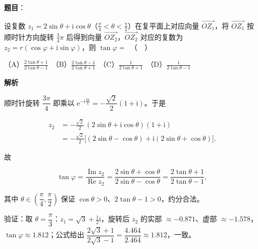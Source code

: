 \begin{answer}

\textbf{题目}：

设复数 $z_1 = 2\sin\theta + \mathrm{i}\cos\theta$（$\frac{\pi}{4} < \theta < \frac{\pi}{2}$）在复平面上对应向量 $\overrightarrow{OZ_1}$，将 $\overrightarrow{OZ_1}$ 按顺时针方向旋转 $\frac{3}{4}\pi$ 后得到向量 $\overrightarrow{OZ_2}$，$\overrightarrow{OZ_2}$ 对应的复数为 $z_2 = r(\cos\varphi + \mathrm{i}\sin\varphi)$，则 $\tan\varphi =$　（　）

（A）$\frac{2\tan\theta + 1}{2\tan\theta - 1}$　（B）$\frac{2\tan\theta - 1}{2\tan\theta + 1}$　（C）$\frac{1}{2\tan\theta + 1}$　（D）$\frac{1}{2\tan\theta - 1}$

\textbf{解析}

顺时针旋转 $\dfrac{3\pi}{4}$ 即乘以 $\mathrm e^{-\mathrm i\frac{3\pi}{4}}=-\dfrac{\sqrt2}{2}(1+\mathrm i)$。于是

\nopagebreak[4]
\[\begin{aligned}
z_2&=-\frac{\sqrt2}{2}\,(2\sin\theta+\mathrm i\cos\theta)(1+\mathrm i)\\
&=-\frac{\sqrt2}{2}\Big[(2\sin\theta-\cos\theta)+\mathrm i(2\sin\theta+\cos\theta)\Big].
\end{aligned}\]

故

\nopagebreak[4]
\[\tan\varphi=\frac{\operatorname{Im}z_2}{\operatorname{Re}z_2}=\frac{2\sin\theta+\cos\theta}{2\sin\theta-\cos\theta}=\frac{2\tan\theta+1}{2\tan\theta-1},\]

其中 $\theta\in\left(\dfrac\pi4,\dfrac\pi2\right)$ 保证 $\cos\theta>0$、$2\tan\theta-1>0$，约分合法。

验证：取 $\theta=\dfrac\pi3$：$z_1=\sqrt3+\tfrac12\mathrm i$，旋转后 $z_2$ 的实部 $\approx-0.871$、虚部 $\approx-1.578$，$\tan\varphi\approx1.812$；公式给出 $\dfrac{2\sqrt3+1}{2\sqrt3-1}=\dfrac{4.464}{2.464}\approx1.812$，一致。


\par\medskip

\end{answer}
